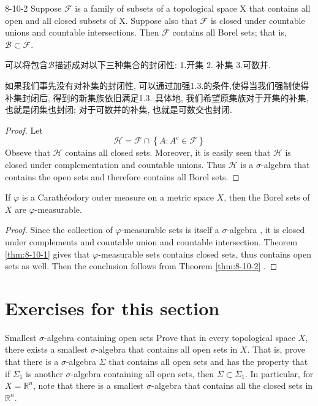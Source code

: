 \documentclass[../main.tex]{subfiles}
\begin{document}
\begin{theorem}{}{8-10-2}
Suppose $\mathcal{F}$ is a family of subsets of a topological space X that contains all open and all closed subsets of X. Suppose also that $\mathcal{F}$ is closed under countable unions and countable intersections. Then $\mathcal{F}$ contains all Borel sets; that is, $\mathcal{B} \subset \mathcal{F}$.
\end{theorem}
\begin{note}
    可以将包含\(  \mathcal{B}  \)描述成对以下三种集合的封闭性: 1.开集 2. 补集 3.可数并. 

    如果我们事先没有对补集的封闭性, 可以通过加强1.3.的条件,使得当我们强制使得补集封闭后, 得到的新集族依旧满足1.3. 具体地, 我们希望原集族对于开集的补集,也就是闭集也封闭; 对于可数并的补集, 也就是可数交也封闭. 
\end{note}
\begin{proof}
    Let \[
    \mathcal{H}=  \mathcal{F}\cap \left\{ A:A^{c}\in \mathcal{F} \right\}
    \] Obseve that \(  \mathcal{H}  \) contains all closed sets. Moreover, it is easily seen that \(  \mathcal{H}  \) is closed under complementation and countable unions. Thus \(  \mathcal{H}  \) is a \(   \sigma   \)-algebra that contains the open sets and therefore contains all Borel sets.    
\end{proof}

\begin{theorem}{}{}
    If \(   \varphi   \) is a Carath\'eodory outer measure on a metric space \(  X  \), then the Borel sets of \(  X  \) are \(   \varphi   \)-measurable.    
\end{theorem}
\begin{proof}
    Since the collection of \(   \varphi   \)-measurable sets is itself a \(   \sigma   \)-algebra , it is closed under complements and countable union and countable intersection. Theorem \ref{thm:8-10-1} gives that \(   \varphi   \)-measurable sets contains closed sets, thus contains open sets as well.  Then  the conclusion follows from Theorem \ref{thm:8-10-2} .
\end{proof}

\section*{Exercises for this section}

\begin{exercise}{Smallest \(   \sigma   \)-algebra containing open sets }{}
    Prove that in every topological space $X$, there exists a smallest $\sigma$-algebra that contains all open sets in $X$. That is, prove that there is a $\sigma$-algebra $\Sigma$ that contains all open sets and has the property that if $\Sigma_1$ is another $\sigma$-algebra containing all open sets, then $\Sigma \subset \Sigma_1$. In particular, for $X = \mathbb{R}^n$, note that there is a smallest $\sigma$-algebra that contains all the closed sets in $\mathbb{R}^n$.
\end{exercise}
\end{document}
